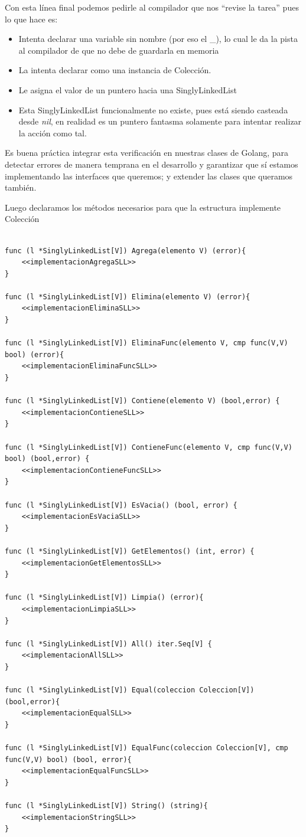 \documentclass[11pt]{article}
\begin{document}
Con esta línea final podemos pedirle al compilador que nos ``revise la tarea'' pues lo que hace es:

\begin{itemize}
\item Intenta declarar una variable sin nombre (por eso el \_), lo cual le da la pista al compilador de que no debe de guardarla en memoria

\item La intenta declarar como una instancia de Colección.

\item Le asigna el valor de un puntero hacia una SinglyLinkedList

\item Esta SinglyLinkedList funcionalmente no existe, pues está siendo casteada desde \emph{nil}, en realidad es un puntero fantasma solamente para intentar realizar la acción como tal.
\end{itemize}

Es buena práctica integrar esta verificación en nuestras clases de Golang, para detectar errores de manera temprana en el desarrollo y garantizar que sí estamos implementando las interfaces que queremos; y extender las clases que queramos también.

Luego declaramos los métodos necesarios para que la estructura implemente Colección

\begin{verbatim}

func (l *SinglyLinkedList[V]) Agrega(elemento V) (error){
	<<implementacionAgregaSLL>>
}

func (l *SinglyLinkedList[V]) Elimina(elemento V) (error){
	<<implementacionEliminaSLL>>
}

func (l *SinglyLinkedList[V]) EliminaFunc(elemento V, cmp func(V,V) bool) (error){
	<<implementacionEliminaFuncSLL>>
}

func (l *SinglyLinkedList[V]) Contiene(elemento V) (bool,error) {
	<<implementacionContieneSLL>>
}

func (l *SinglyLinkedList[V]) ContieneFunc(elemento V, cmp func(V,V) bool) (bool,error) {
	<<implementacionContieneFuncSLL>>
}

func (l *SinglyLinkedList[V]) EsVacia() (bool, error) {
	<<implementacionEsVaciaSLL>>
}

func (l *SinglyLinkedList[V]) GetElementos() (int, error) {
	<<implementacionGetElementosSLL>>
}

func (l *SinglyLinkedList[V]) Limpia() (error){
	<<implementacionLimpiaSLL>>
}

func (l *SinglyLinkedList[V]) All() iter.Seq[V] {
	<<implementacionAllSLL>>
}

func (l *SinglyLinkedList[V]) Equal(coleccion Coleccion[V]) (bool,error){
	<<implementacionEqualSLL>>
}

func (l *SinglyLinkedList[V]) EqualFunc(coleccion Coleccion[V], cmp func(V,V) bool) (bool, error){
	<<implementacionEqualFuncSLL>>
}

func (l *SinglyLinkedList[V]) String() (string){
	<<implementacionStringSLL>>
}
\end{verbatim}
\end{document}
